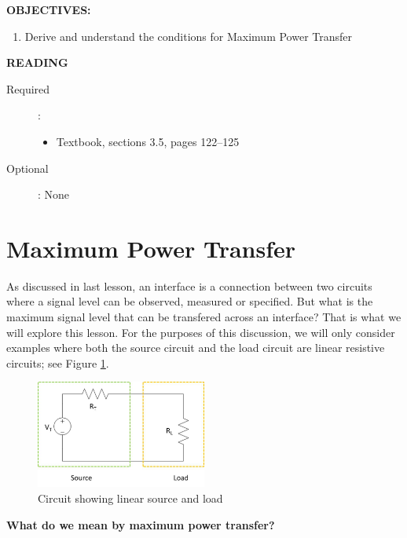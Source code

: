 \documentclass{handout}
\begin{document}
\maketitle


\textbf{OBJECTIVES:}
\begin{enumerate}
\item Derive and understand the conditions for Maximum Power Transfer
\end{enumerate}

\textbf{READING}
\begin{description}
\item [Required]:
\begin{itemize}
\item  Textbook, sections 3.5, pages 122--125
\end{itemize}
\item [Optional]: None
\end{description}


\section{Maximum Power Transfer}
As discussed in last lesson, an interface is a connection between two circuits where a signal level can be observed, measured or specified.  But what is the maximum signal level that can be transfered across an interface?  That is what we will explore this lesson.  For the purposes of this discussion, we will only consider examples where both the source circuit and the load circuit are linear resistive circuits; see Figure \ref{fig: Source_Load}.
\begin{figure} [h t b]
\centering
\includegraphics[width=0.5\textwidth]{Source_Load.jpg}
\caption{Circuit showing linear source and load}
\label{fig: Source_Load}
\end{figure}

\textbf{What do we mean by maximum power transfer?}


\newpage
\pagebreak
\clearpage
\end{document}
